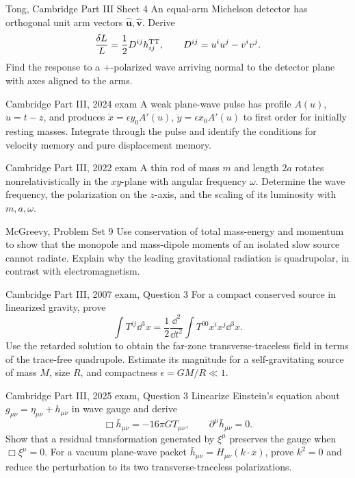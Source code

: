 \begin{exercises}
\begin{exercise}{Tong, Cambridge Part III Sheet 4}
An equal-arm Michelson detector has orthogonal unit arm vectors
\(\hat{\bm u},\hat{\bm v}\).  Derive
\[
\frac{\delta L}{L}
=\frac12D^{ij}h^{\rm TT}_{ij},\qquad
D^{ij}=u^iu^j-v^iv^j.
\]
Find the response to a \(+\)-polarized wave arriving normal to the detector
plane with axes aligned to the arms.
\end{exercise}

\begin{exercise}{Cambridge Part III, 2024 exam}
A weak plane-wave pulse has profile \(A(u)\), \(u=t-z\), and produces
\(\ddot x=\epsilon y_0A'(u)\),
\(\ddot y=\epsilon x_0A'(u)\) to first order for initially resting masses.
Integrate through the pulse and identify the conditions for velocity memory
and pure displacement memory.
\end{exercise}

\begin{exercise}{Cambridge Part III, 2022 exam}
A thin rod of mass \(m\) and length \(2a\) rotates nonrelativistically in the
\(xy\)-plane with angular frequency \(\omega\).  Determine the wave frequency,
the polarization on the \(z\)-axis, and the scaling of its luminosity with
\(m,a,\omega\).
\end{exercise}

\begin{exercise}{McGreevy, Problem Set 9}
Use conservation of total mass-energy and momentum to show that the monopole
and mass-dipole moments of an isolated slow source cannot radiate.  Explain
why the leading gravitational radiation is quadrupolar, in contrast with
electromagnetism.
\end{exercise}

\begin{exercise}{Cambridge Part III, 2007 exam, Question 3}
For a compact conserved source in linearized gravity, prove
\[
\int T^{ij}\dd^3x
=\frac12\frac{\dd^2}{\dd t^2}
\int T^{00}x^ix^j\dd^3x.
\]
Use the retarded solution to obtain the far-zone transverse-traceless field
in terms of the trace-free quadrupole.  Estimate its magnitude for a
self-gravitating source of mass \(M\), size \(R\), and compactness
\(\epsilon=GM/R\ll1\).
\end{exercise}

\begin{exercise}{Cambridge Part III, 2025 exam, Question 3}
Linearize Einstein's equation about
\(g_{\mu\nu}=\eta_{\mu\nu}+h_{\mu\nu}\) in wave gauge and derive
\[
\Box\bar h_{\mu\nu}=-16\pi G T_{\mu\nu},
\qquad
\partial^\mu\bar h_{\mu\nu}=0.
\]
Show that a residual transformation generated by \(\xi^\mu\) preserves the
gauge when \(\Box\xi^\mu=0\).  For a vacuum plane-wave packet
\(\bar h_{\mu\nu}=H_{\mu\nu}(k\cdot x)\), prove \(k^2=0\) and reduce the
perturbation to its two transverse-traceless polarizations.
\end{exercise}


\end{exercises}
